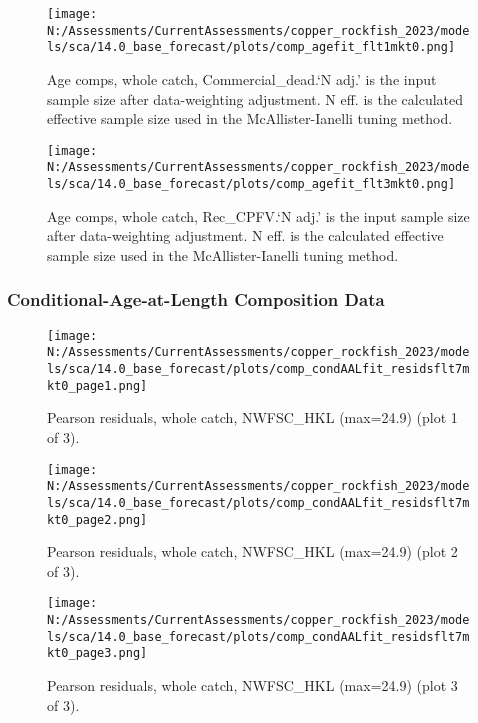 \documentclass[11pt,
  english,
  letterpaper,
]{article}
\begin{document}
\begin{figure}
\centering
\texttt{[image: N:/Assessments/CurrentAssessments/copper\_rockfish\_2023/models/sca/14.0\_base\_forecast/plots/comp\_agefit\_flt1mkt0.png]}
\caption{Age comps, whole catch, Commercial\_dead.`N adj.' is the input sample size after data-weighting adjustment. N eff. is the calculated effective sample size used in the McAllister-Ianelli tuning method.\label{fig:comp_agefit_flt1mkt0}}
\end{figure}

\begin{figure}
\centering
\texttt{[image: N:/Assessments/CurrentAssessments/copper\_rockfish\_2023/models/sca/14.0\_base\_forecast/plots/comp\_agefit\_flt3mkt0.png]}
\caption{Age comps, whole catch, Rec\_CPFV.`N adj.' is the input sample size after data-weighting adjustment. N eff. is the calculated effective sample size used in the McAllister-Ianelli tuning method.\label{fig:comp_agefit_flt3mkt0}}
\end{figure}

\newpage

\hypertarget{caal-data}{%
\subsubsection{Conditional-Age-at-Length Composition Data}\label{caal-data}}

\begin{figure}
\centering
\texttt{[image: N:/Assessments/CurrentAssessments/copper\_rockfish\_2023/models/sca/14.0\_base\_forecast/plots/comp\_condAALfit\_residsflt7mkt0\_page1.png]}
\caption{Pearson residuals, whole catch, NWFSC\_HKL (max=24.9) (plot 1 of 3).\label{fig:comp_condAALfit_residsflt7mkt0_page1}}
\end{figure}

\begin{figure}
\centering
\texttt{[image: N:/Assessments/CurrentAssessments/copper\_rockfish\_2023/models/sca/14.0\_base\_forecast/plots/comp\_condAALfit\_residsflt7mkt0\_page2.png]}
\caption{Pearson residuals, whole catch, NWFSC\_HKL (max=24.9) (plot 2 of 3).\label{fig:comp_condAALfit_residsflt7mkt0_page2}}
\end{figure}

\begin{figure}
\centering
\texttt{[image: N:/Assessments/CurrentAssessments/copper\_rockfish\_2023/models/sca/14.0\_base\_forecast/plots/comp\_condAALfit\_residsflt7mkt0\_page3.png]}
\caption{Pearson residuals, whole catch, NWFSC\_HKL (max=24.9) (plot 3 of 3).\label{fig:comp_condAALfit_residsflt7mkt0_page3}}
\end{figure}
\end{document}
